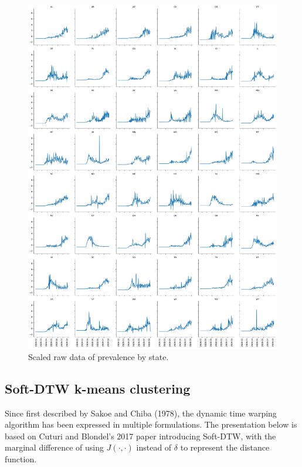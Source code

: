 \documentclass{article}
\begin{document}
\begin{figure}
	\includegraphics[width=\linewidth]{figures/scaled-by-state}
	\centering
	\caption{Scaled raw data of prevalence by state.}
	\label{fig:scaled_by_state}
\end{figure}


\subsection{Soft-DTW k-means clustering} %
\label{sub:soft_dtw_k_means_clustering}

Since first described by Sakoe and Chiba (1978),\cite{sakoe1978dynamic} the dynamic time warping algorithm has been expressed in multiple formulations. The presentation below is based on Cuturi and Blondel's 2017 paper introducing Soft-DTW, with the marginal difference of using $J(\cdot, \cdot)$ instead of $\delta$ to represent the distance function.\cite{cuturi2017soft} 
\end{document}
